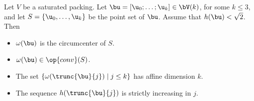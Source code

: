\begin{lemma}[]\label{lemma:v2} 
Let $V$ be a saturated packing.
Let $\bu=[\u_0;\ldots;\u_k]\in \bV(k)$, for some $k\le 3$,
and let $S=\{\u_0,\ldots,\u_k\}$ be the
point set of $\bu$.
Assume that $h(\bu)<\sqrt2$.
Then 
\begin{itemize} 
\item%
$\omega(\bu)$ is the circumcenter of $S$.
\item%
$\omega(\bu)\in\op{conv}(S)$.
\item%
The set $\{\omega(\trunc{\bu}{j})\mid j\le k\}$ has affine dimension $k$.
\item
The sequence $h(\trunc{\bu}{j})$ is
strictly increasing in $j$.
\end{itemize}
\end{lemma}
%

